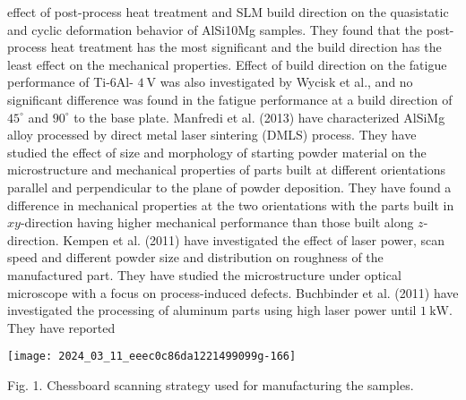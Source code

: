 \documentclass[10pt]{article}
\begin{document}
effect of post-process heat treatment and SLM build direction on the quasistatic and cyclic deformation behavior of AlSi10Mg samples. They found that the post-process heat treatment has the most significant and the build direction has the least effect on the mechanical properties. Effect of build direction on the fatigue performance of Ti-6Al- $4 \mathrm{~V}$ was also investigated by Wycisk et al., and no significant difference was found in the fatigue performance at a build direction of $45^{\circ}$ and $90^{\circ}$ to the base plate. Manfredi et al. (2013) have characterized AlSiMg alloy processed by direct metal laser sintering (DMLS) process. They have studied the effect of size and morphology of starting powder material on the microstructure and mechanical properties of parts built at different orientations parallel and perpendicular to the plane of powder deposition. They have found a difference in mechanical properties at the two orientations with the parts built in $x y$-direction having higher mechanical performance than those built along $z$-direction. Kempen et al. (2011) have investigated the effect of laser power, scan speed and different powder size and distribution on roughness of the manufactured part. They have studied the microstructure under optical microscope with a focus on process-induced defects. Buchbinder et al. (2011) have investigated the processing of aluminum parts using high laser power until $1 \mathrm{~kW}$. They have reported

\begin{center}
\texttt{[image: 2024\_03\_11\_eeec0c86da1221499099g-166]}
\end{center}

Fig. 1. Chessboard scanning strategy used for manufacturing the samples.
\end{document}
